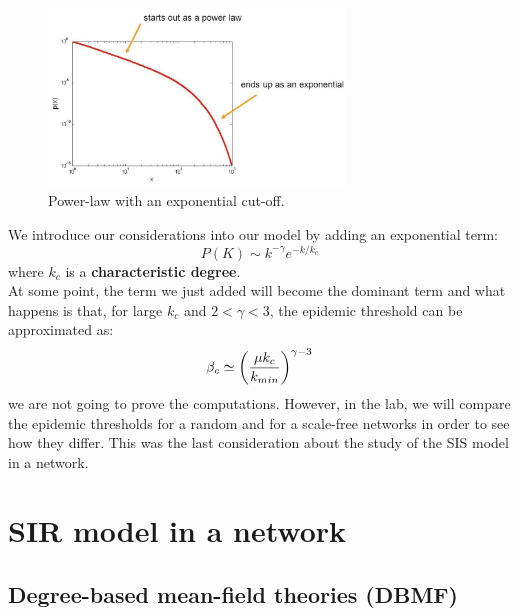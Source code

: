 \documentclass[../main/main.tex]{subfiles}
\begin{document}
\begin{figure}[h!]
\centering
\includegraphics[width=0.7\textwidth]{../lessons/image/07/2.png}
\caption{\label{fig:07_2} Power-law with an exponential cut-off.}
\end{figure}

We introduce our considerations into our model by adding an exponential term:
 \begin{equation}
   P(K) \sim k^{- \gamma}   e^{-k/k_c}
 \end{equation}
where \( k_c \) is a \textbf{characteristic degree}.\\
At some point, the term we just added will become the dominant term and what happens is that, for large \( k_c \) and \( 2 < \gamma < 3  \), the epidemic threshold can be approximated as:
\begin{equation}
  \beta _c \simeq \qty(\frac{\mu k_c}{k_{min}})^{\gamma -3 }
\end{equation}
we are not going to prove the computations. However, in the lab, we will compare the epidemic thresholds for a random and for a scale-free networks in order to see how they differ. This was the last consideration about the study of the SIS model in a network.

\medskip

\section{SIR model in a network}

\subsection{Degree-based mean-field theories (DBMF)}
\end{document}
